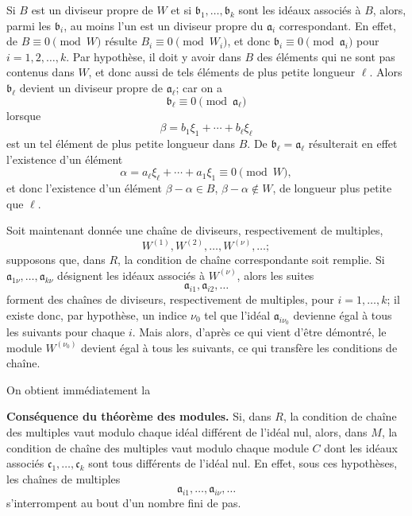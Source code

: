 Si $B$ est un diviseur propre de $W$ et si $\mathfrak b_1,\ldots,\mathfrak b_k$ sont les idéaux associés à $B$, alors, parmi les $\mathfrak b_i$, au moins l'un est un diviseur propre du $\mathfrak a_i$ correspondant. En effet, de $B\equiv0\pmod W$ résulte $B_i\equiv0\pmod {W_i}$, et donc $\mathfrak b_i\equiv0\pmod{\mathfrak a_i}$ pour $i=1,2,\ldots,k$. Par hypothèse, il doit y avoir dans $B$ des éléments qui ne sont pas contenus dans $W$, et donc aussi de tels éléments de plus petite longueur $\ell$. Alors $\mathfrak b_\ell$ devient un diviseur propre de $\mathfrak a_\ell$; car on a
\[
        \mathfrak b_\ell\equiv0\pmod{\mathfrak a_\ell}
\]
lorsque
\[
        \beta=b_1\xi_1+\cdots+b_\ell\xi_\ell
\]
est un tel élément de plus petite longueur dans $B$. De $\mathfrak b_\ell=\mathfrak a_\ell$ résulterait en effet l'existence d'un élément
\[
        \alpha=a_\ell\xi_\ell+\cdots+a_1\xi_1\equiv0\pmod W,
\]
et donc l'existence d'un élément $\beta-\alpha\in B$, $\beta-\alpha\notin W$, de longueur plus petite que $\ell$.

Soit maintenant donnée une chaîne de diviseurs, respectivement de multiples,
\[
        W^{(1)},W^{(2)},\ldots,W^{(\nu)},\ldots ;
\]
supposons que, dans $R$, la condition de chaîne correspondante soit remplie. Si $\mathfrak a_{1\nu},\ldots,\mathfrak a_{k\nu}$ désignent les idéaux associés à $W^{(\nu)}$, alors les suites
\[
        \mathfrak a_{i1},\mathfrak a_{i2},\ldots
\]
forment des chaînes de diviseurs, respectivement de multiples, pour $i=1,\ldots,k$; il existe donc, par hypothèse, un indice $\nu_0$ tel que l'idéal $\mathfrak a_{i\nu_0}$ devienne égal à tous les suivants pour chaque $i$. Mais alors, d'après ce qui vient d'être démontré, le module $W^{(\nu_0)}$ devient égal à tous les suivants, ce qui transfère les conditions de chaîne.

On obtient immédiatement la

\medskip
\noindent\textbf{Conséquence du théorème des modules.} Si, dans $R$, la condition de chaîne des multiples vaut modulo chaque idéal différent de l'idéal nul, alors, dans $M$, la condition de chaîne des multiples vaut modulo chaque module $C$ dont les idéaux associés $\mathfrak c_1,\ldots,\mathfrak c_k$ sont tous différents de l'idéal nul. En effet, sous ces hypothèses, les chaînes de multiples
\[
        \mathfrak a_{i1},\ldots,\mathfrak a_{i\nu},\ldots
\]
s'interrompent au bout d'un nombre fini de pas.


